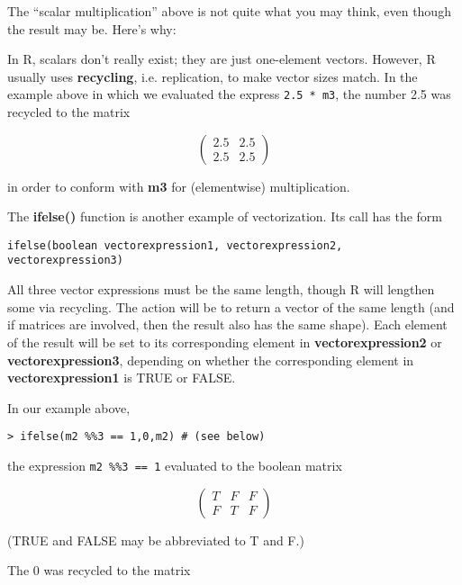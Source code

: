 The ``scalar multiplication'' above is not quite what you may think,
even though the result may be.  Here's why:

In R, scalars don't really exist; they are just one-element vectors.
However, R usually uses {\bf recycling}, i.e. replication, to make
vector sizes match.  In the example above in which we evaluated the
express \verb^2.5 * m3^, the number 2.5 was recycled to the matrix 

\begin{equation}
\left (
\begin{array}{rr}
2.5 & 2.5 \\
2.5 & 2.5 
\end{array}
\right )
\end{equation}

in order to conform with {\bf m3} for (elementwise) multiplication.

The {\bf ifelse()} function is another example of vectorization.  Its
call has the form

\begin{lstlisting}
ifelse(boolean vectorexpression1, vectorexpression2, vectorexpression3)
\end{lstlisting}

All three vector expressions must be the same length, though R will
lengthen some via recycling.  The action will be to return a vector of
the same length (and if matrices are involved, then the result also has
the same shape).  Each element of the result will be set to its
corresponding element in {\bf vectorexpression2} or {\bf
vectorexpression3}, depending on whether the corresponding element in
{\bf vectorexpression1} is TRUE or FALSE.

In our example above,

\begin{lstlisting}
> ifelse(m2 %%3 == 1,0,m2) # (see below)
\end{lstlisting}

the expression \verb^m2 %%3 == 1^ evaluated to the boolean matrix

\begin{equation}
\left (
\begin{array}{rrr}
T & F & F\\
F & T & F
\end{array}
\right )
\end{equation}

(TRUE and FALSE may be abbreviated to T and F.)

The 0 was recycled to the matrix

